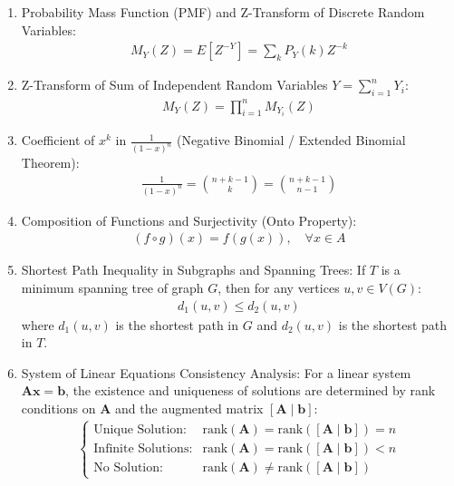 \begin{enumerate}[label=\thesubsection.\arabic*, ref=\thesubsection.\theenumi]

\item Probability Mass Function (PMF) and Z-Transform of Discrete Random Variables:
\begin{align}
M_Y(Z) = E[Z^{-Y}] = \sum_k P_Y(k) Z^{-k} \label{eq:CS12025-pmf_ztransform}
\end{align}

\item Z-Transform of Sum of Independent Random Variables $Y = \sum_{i=1}^n Y_i$:
\begin{align}
M_Y(Z) = \prod_{i=1}^n M_{Y_i}(Z) \label{eq:CS12025-ztransform_sum}
\end{align}

\item Coefficient of $x^k$ in $\frac{1}{(1-x)^n}$ (Negative Binomial / Extended Binomial Theorem):
\begin{align}
[x^k] \frac{1}{(1-x)^n} = \binom{n + k - 1}{k} = \binom{n + k - 1}{n - 1} \label{eq:CS12025-coefficient_negative_binomial}
\end{align}

\item Composition of Functions and Surjectivity (Onto Property):
\begin{align}
(f \circ g)(x) = f(g(x)), \quad \forall x \in A \label{eq:CS12025-function_composition}
\end{align}

\item Shortest Path Inequality in Subgraphs and Spanning Trees:
If $T$ is a minimum spanning tree of graph $G$, then for any vertices $u, v \in V(G)$:
\begin{align}
d_1(u, v) \le d_2(u, v) \label{eq:CS12025-shortest_path_mst}
\end{align}
where $d_1(u,v)$ is the shortest path in $G$ and $d_2(u,v)$ is the shortest path in $T$.

\item System of Linear Equations Consistency Analysis:
For a linear system $\mathbf{A}\mathbf{x} = \mathbf{b}$, the existence and uniqueness of solutions are determined by rank conditions on $\mathbf{A}$ and the augmented matrix $[\mathbf{A} \mid \mathbf{b}]$:
\begin{align}
\begin{cases}
\text{Unique Solution:} & \text{rank}(\mathbf{A}) = \text{rank}([\mathbf{A} \mid \mathbf{b}]) = n \\
\text{Infinite Solutions:} & \text{rank}(\mathbf{A}) = \text{rank}([\mathbf{A} \mid \mathbf{b}]) < n \\
\text{No Solution:} & \text{rank}(\mathbf{A}) \neq \text{rank}([\mathbf{A} \mid \mathbf{b}])
\end{cases}
\label{eq:CS12025-linear_system_rank}
\end{align}


\end{enumerate}
